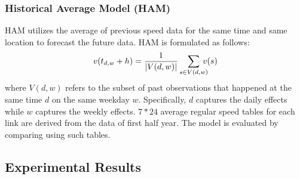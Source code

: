 \subsubsection{Historical Average Model (HAM)}
HAM utilizes the average of previous speed data for the same time and same location to forecast the future data. 
HAM is formulated as follows:
$$  v (t_{d,w} +h ) = \frac{1}{|V(d,w)|} \sum _{s\in V(d,w)} \hspace{-8pt} v(s)$$
where $V(d, w)$ refers to the subset of past observations that happened at the same time $d$ on the same weekday $w$. 
Specifically, $d$ captures the daily effects while $w$ captures the weekly effects. 
$7*24$ average regular speed tables for each link are derived from the data of first half year. 
The model is evaluated by comparing using such tables. 
%		

 


\subsection{Experimental Results}

